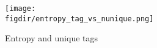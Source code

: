 

\begin{landscape}
    
\end{landscape}

\begin{figure}[H]
    \caption{Entropy and unique tags}
    \label{fig:entropy_tag_vs_nunique}
    \begin{center}
        \texttt{[image: \\figdir/entropy\_tag\_vs\_nunique.png]}
    \end{center}
\end{figure}

